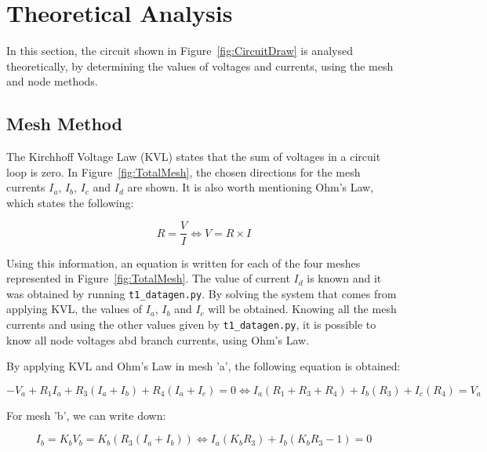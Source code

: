 \section{Theoretical Analysis}
\label{sec:analysis}

In this section, the circuit shown in Figure~\ref{fig:CircuitDraw} is analysed theoretically, by determining the values of voltages and currents, using the mesh and node methods.

\subsection{Mesh Method}

The Kirchhoff Voltage Law (KVL) states that the sum of voltages in a circuit loop is zero. In Figure~\ref{fig:TotalMesh}, the chosen directions for the mesh currents $I_a$, $I_b$, $I_c$ and $I_d$ are shown. It is also worth mentioning Ohm's Law, which states the following:
\par

\begin{equation}
  R=\frac{V}{I} \Leftrightarrow V=R \times I
  \label{eq:OhmLaw}
\end{equation}

Using this information, an equation is written for each of the four meshes represented in Figure~\ref{fig:TotalMesh}. The value of current $I_d$ is known and it was obtained by running \texttt{t1\_datagen.py}. By solving the system that comes from applying KVL, the values of $I_a$, $I_b$ and $I_c$ will be obtained. Knowing all the mesh currents and using the other values given by \texttt{t1\_datagen.py}, it is possible to know all node voltages abd branch currents, using Ohm's Law.

\par
\vspace{1mm}

By applying KVL and Ohm's Law in mesh 'a', the following equation is obtained:

\begin{equation}
  -V_a+R_1I_a+R_3(I_a+I_b)+R_4(I_a+I_c)=0 \Leftrightarrow I_a(R_1+R_3+R_4)+I_b(R_3)+I_c(R_4)=V_a
  \label{eq:Mesh_a}
\end{equation}

For mesh 'b', we can write down:

\begin{equation}
  I_b=K_bV_b=K_b(R_3(I_a+I_b)) \Leftrightarrow I_a(K_bR_3)+I_b(K_bR_3-1)=0
  \label{eq:Mesh_b}
\end{equation}

